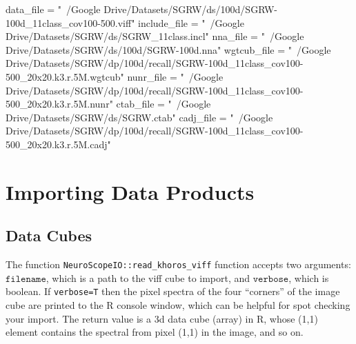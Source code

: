 \documentclass[]{article}
\newenvironment{Shaded}{\begin{snugshade}}{\end{snugshade}}
\newcommand{\NormalTok}[1]{#1}
\newcommand{\StringTok}[1]{\textcolor[rgb]{0.31,0.60,0.02}{#1}}
\begin{document}
\begin{Shaded}
\begin{Highlighting}[]
\NormalTok{data_file =}\StringTok{ "~/Google Drive/Datasets/SGRW/ds/100d/SGRW-100d_11class_cov100-500.viff"}
\NormalTok{include_file =}\StringTok{ "~/Google Drive/Datasets/SGRW/ds/SGRW_11class.incl"}
\NormalTok{nna_file =}\StringTok{ "~/Google Drive/Datasets/SGRW/ds/100d/SGRW-100d.nna"}
\NormalTok{wgtcub_file =}\StringTok{ "~/Google Drive/Datasets/SGRW/dp/100d/recall/SGRW-100d_11class_cov100-500_20x20.k3.r.5M.wgtcub"}
\NormalTok{nunr_file =}\StringTok{ "~/Google Drive/Datasets/SGRW/dp/100d/recall/SGRW-100d_11class_cov100-500_20x20.k3.r.5M.nunr"}
\NormalTok{ctab_file =}\StringTok{ "~/Google Drive/Datasets/SGRW/ds/SGRW.ctab"}
\NormalTok{cadj_file =}\StringTok{ "~/Google Drive/Datasets/SGRW/dp/100d/recall/SGRW-100d_11class_cov100-500_20x20.k3.r.5M.cadj"}
\end{Highlighting}
\end{Shaded}

\hypertarget{importing-data-products}{%
\section{Importing Data Products}\label{importing-data-products}}

\hypertarget{data-cubes}{%
\subsection{Data Cubes}\label{data-cubes}}

The function \texttt{NeuroScopeIO::read\_khoros\_viff} function accepts two arguments: \(\texttt{filename}\), which is a path to the viff cube to import, and \(\texttt{verbose}\), which is boolean. If \texttt{verbose=T} then the pixel spectra of the four ``corners'' of the image cube are printed to the R console window, which can be helpful for spot checking your import. The return value is a 3d data cube (array) in R, whose (1,1) element contains the spectral from pixel (1,1) in the image, and so on.
\end{document}
